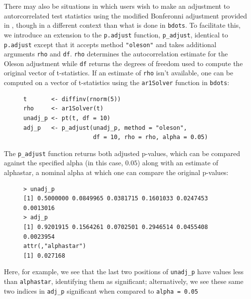 \documentclass{article}
\newcommand{\xt}{\texttt}%
\begin{document}
There may also be situations in which users wish to make an adjustment to autorcorrelated test statistics using the modified Bonferonni adjustment provided in \cite{oleson2017detecting}, though in a different context than what is done in \xt{bdots}. To facilitate this, we introduce an extension to the \xt{p.adjust} function, \xt{p\_adjust}, identical to \xt{p.adjust} except that it accepts method \xt{"oleson"} and takes additional arguments \xt{rho} and \xt{df}. \xt{rho} determines the autocorrelation estimate for the Oleson adjustment while \xt{df} returns the degrees of freedom used to compute the original vector of t-statistics. If an estimate of \xt{rho} isn't available, one can be computed on a vector of t-statistics using the \xt{ar1Solver} function in \xt{bdots}:


\begin{singlespace}
\begin{figure}[H]
\centering
\begin{BVerbatim}
t       <- diffinv(rnorm(5))
rho     <- ar1Solver(t)
unadj_p <- pt(t, df = 10)
adj_p   <- p_adjust(unadj_p, method = "oleson", 
                    df = 10, rho = rho, alpha = 0.05)
\end{BVerbatim}
\end{figure}
\end{singlespace}

The \xt{p\_adjust} function returns both adjusted p-values, which can be compared against the specified alpha (in this case, $0.05$) along with an estimate of alphastar, a nominal alpha at which one can compare the original p-values:

\begin{singlespace}
\begin{figure}[H]
\centering
\begin{BVerbatim}
> unadj_p
[1] 0.5000000 0.0849965 0.0381715 0.1601033 0.0247453 0.0013016
> adj_p
[1] 0.9201915 0.1564261 0.0702501 0.2946514 0.0455408 0.0023954
attr(,"alphastar")
[1] 0.027168
\end{BVerbatim}
\end{figure}
\end{singlespace}

Here, for example, we see that the last two positions of \xt{unadj\_p} have values less than \xt{alphastar}, identifying them as significant; alternatively, we see these same two indices in \xt{adj\_p} significant when compared to \xt{alpha = 0.05}
\end{document}
